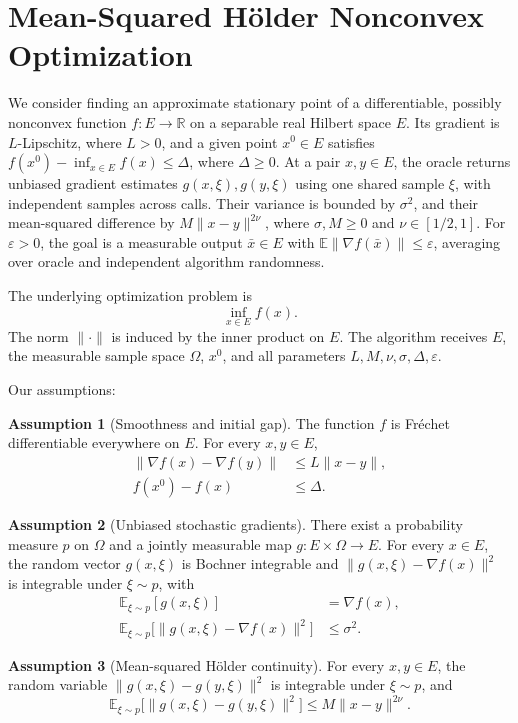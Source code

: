 \documentclass[10pt]{article}
\theoremstyle{definition}
\newtheorem{assumption}{Assumption}
\begin{document}
\section*{Mean-Squared H\"older Nonconvex Optimization}
We consider finding an approximate stationary point of a differentiable, possibly nonconvex function $f:E\to\mathbb{R}$ on a separable real Hilbert space $E$. Its gradient is $L$-Lipschitz, where $L>0$, and a given point $x^0\in E$ satisfies $f(x^0)-\inf_{x\in E}f(x)\leq\Delta$, where $\Delta\geq0$. At a pair $x,y\in E$, the oracle returns unbiased gradient estimates $g(x,\xi),g(y,\xi)$ using one shared sample $\xi$, with independent samples across calls. Their variance is bounded by $\sigma^2$, and their mean-squared difference by $M\|x-y\|^{2\nu}$, where $\sigma,M\geq0$ and $\nu\in[1/2,1]$. For $\varepsilon>0$, the goal is a measurable output $\bar{x}\in E$ with $\mathbb{E}\|\nabla f(\bar{x})\|\leq\varepsilon$, averaging over oracle and independent algorithm randomness.

The underlying optimization problem is
\[
\inf_{x\in E} f(x).
\]
The norm $\|\cdot\|$ is induced by the inner product on $E$. The algorithm receives $E$, the measurable sample space $\Omega$, $x^0$, and all parameters $L,M,\nu,\sigma,\Delta,\varepsilon$.

Our assumptions:
\begin{assumption}[Smoothness and initial gap]
The function $f$ is Fr\'echet differentiable everywhere on $E$. For every $x,y\in E$,
\[
\begin{aligned}
\|\nabla f(x)-\nabla f(y)\|&\leq L\|x-y\|,\\
f(x^0)-f(x)&\leq\Delta.
\end{aligned}
\]
\end{assumption}

\begin{assumption}[Unbiased stochastic gradients]
There exist a probability measure $p$ on $\Omega$ and a jointly measurable map $g:E\times\Omega\to E$. For every $x\in E$, the random vector $g(x,\xi)$ is Bochner integrable and $\|g(x,\xi)-\nabla f(x)\|^2$ is integrable under $\xi\sim p$, with
\[
\begin{aligned}
\mathbb{E}_{\xi\sim p}[g(x,\xi)]&=\nabla f(x),\\
\mathbb{E}_{\xi\sim p}\bigl[\|g(x,\xi)-\nabla f(x)\|^2\bigr]&\leq\sigma^2.
\end{aligned}
\]
\end{assumption}

\begin{assumption}[Mean-squared H\"older continuity]
For every $x,y\in E$, the random variable $\|g(x,\xi)-g(y,\xi)\|^2$ is integrable under $\xi\sim p$, and
\[
\mathbb{E}_{\xi\sim p}\bigl[\|g(x,\xi)-g(y,\xi)\|^2\bigr]
\leq M\|x-y\|^{2\nu}.
\]
\end{assumption}
\end{document}
